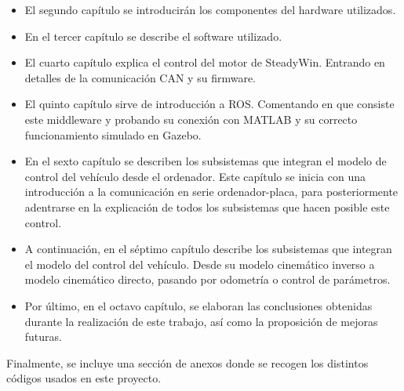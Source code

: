 \begin{itemize}
    \item El segundo capítulo se introducirán los componentes del hardware utilizados.
    \item En el tercer capítulo se describe el software utilizado.
    \item El cuarto capítulo explica el control del motor de SteadyWin. Entrando en detalles de la comunicación CAN y su firmware.
    \item El quinto capítulo sirve de introducción a ROS. Comentando en que consiste este middleware y probando su conexión con MATLAB y su correcto funcionamiento simulado en Gazebo.
    \item En el sexto capítulo se describen los subsistemas que integran el modelo de control del vehículo desde el ordenador. Este capítulo se inicia con una introducción a la comunicación en serie ordenador-placa, para posteriormente adentrarse en la explicación de todos los subsistemas que hacen posible este control.
    \item A continuación, en el séptimo capítulo describe los subsistemas que integran el modelo del control del vehículo. Desde su modelo cinemático inverso a modelo cinemático directo, pasando por odometría o control de parámetros.
    \item Por último, en el octavo capítulo, se elaboran las conclusiones obtenidas durante la realización de este trabajo, así como la proposición de mejoras futuras. 
\end{itemize}

Finalmente, se incluye una sección de anexos donde se recogen los distintos códigos usados en este proyecto.

